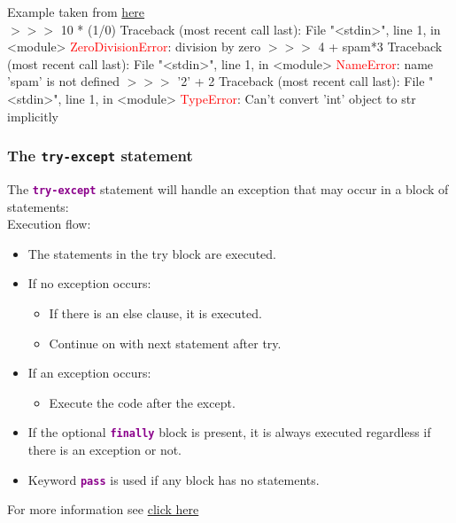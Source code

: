 \documentclass[xcolor=svgnames]{beamer}
\newcommand{\red}[1]{\textcolor{red}{#1}}
\newcommand{\nl}{\\[1em]}
\newcommand{\command}[1]{\texttt{\textbf{\textcolor{DarkMagenta}{#1}}}}
\newcommand{\ft}[1]{\frametitle{#1}}
\newenvironment{allintypewriter}{\ttfamily}{\par}
\begin{document}
\begin{frame}[fragile]
Example taken from \href{https://docs.python.org/3/tutorial/errors.html}{here}\\
\begin{allintypewriter} { \small
$>>>$ 10 * (1/0)\newline
Traceback (most recent call last):\newline
  File "<stdin>", line 1, in <module>\newline
\red{ZeroDivisionError}: division by zero\newline
$>>>$ 4 + spam*3\newline
Traceback (most recent call last):\newline
  File "<stdin>", line 1, in <module>\newline
\red{NameError}: name 'spam' is not defined\newline
$>>>$ '2' + 2\newline
Traceback (most recent call last):\newline
  File "<stdin>", line 1, in <module>\newline
\red{TypeError}: Can't convert 'int' object to str implicitly}
\end{allintypewriter}

\end{frame}


\begin{frame}\ft{The {\tt try-except} statement}
The \command{try-except} statement will handle an exception that may occur in a  block of statements:\nl

Execution flow:
\begin{itemize}
\item The statements in the try block are executed.
\item If no exception occurs:
\begin{itemize}
\item If there is an else clause, it is executed.
\item Continue on with next statement after try.
\end{itemize}
\item If an exception occurs:
\begin{itemize}
\item Execute the code after the except.
\end{itemize}
\item If the optional \command{finally} block is present, it is always executed regardless if there is an  exception or not.
\item Keyword \command{pass} is used if any block has no statements.
\end{itemize}

For more information see \href{https://docs.python.org/3/tutorial/errors.html}{click here}
\end{frame}
%
\end{document}
